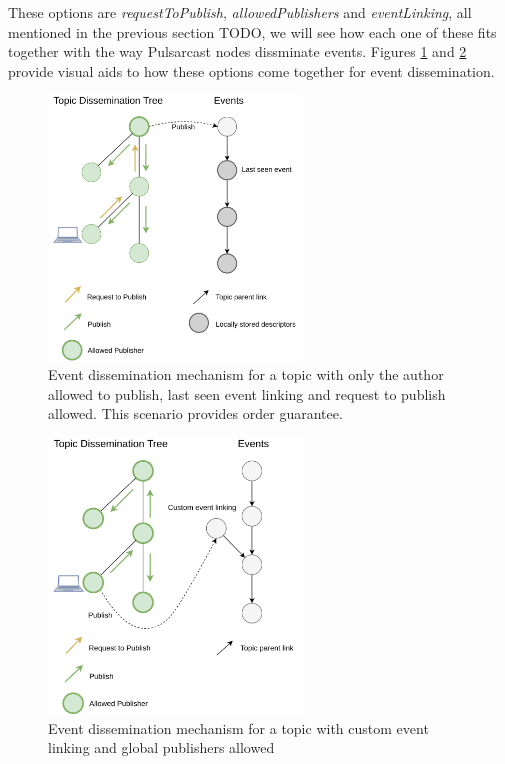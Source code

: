 These options are \emph{requestToPublish}, \emph{allowedPublishers} and
\emph{eventLinking}, all mentioned in the previous section TODO, we will see
how each one of these fits together with the way Pulsarcast nodes dissminate
events. Figures \ref{fig:pulsarcast-publish-order-guarantee} and
\ref{fig:pulsarcast-publish-custom} provide visual aids to how these options
come together for event dissemination.

\begin{figure}[hb!]
  \centering
  \includegraphics[width=0.6\textwidth]{img/pulsarcast-publish-order-guarantee.png}
  \caption{Event dissemination mechanism for a topic with only the author allowed to publish, last seen event linking and request to publish allowed. This scenario provides order guarantee.}
  \label{fig:pulsarcast-publish-order-guarantee}
\end{figure}

\begin{figure}[hb!]
  \centering
  \includegraphics[width=0.6\textwidth]{img/pulsarcast-publish-custom.png}
  \caption{Event dissemination mechanism for a topic with custom event linking and global publishers allowed}
  \label{fig:pulsarcast-publish-custom}
\end{figure}

